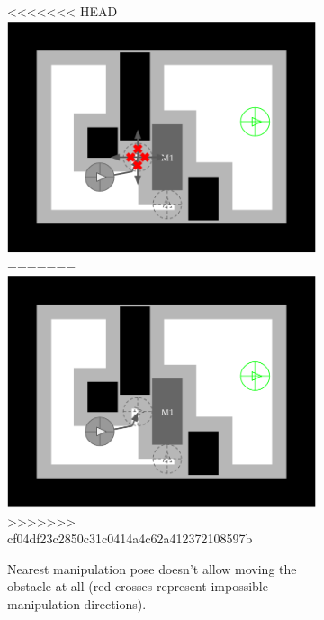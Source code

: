 \begin{figure}[H]
\centering
\begin{subfigure}{.35\textwidth}
  \centering
<<<<<<< HEAD
  \includegraphics[width=\linewidth]{Figures/Manipulation_Pose/manip_pose_2.png}
=======
  \includegraphics[width=\linewidth]{Figures/Manipulation_Pose/manip_pose_1.png}
>>>>>>> cf04df23c2850c31c0414a4c62a412372108597b
  \caption{Nearest manipulation pose doesn't allow moving the obstacle at all (red crosses represent impossible manipulation directions).}
  \label{fig:manip_pose_2}
\end{subfigure}\hspace*{\fill}
\begin{subfigure}{.35\textwidth}

\end{subfigure}
\end{figure}
